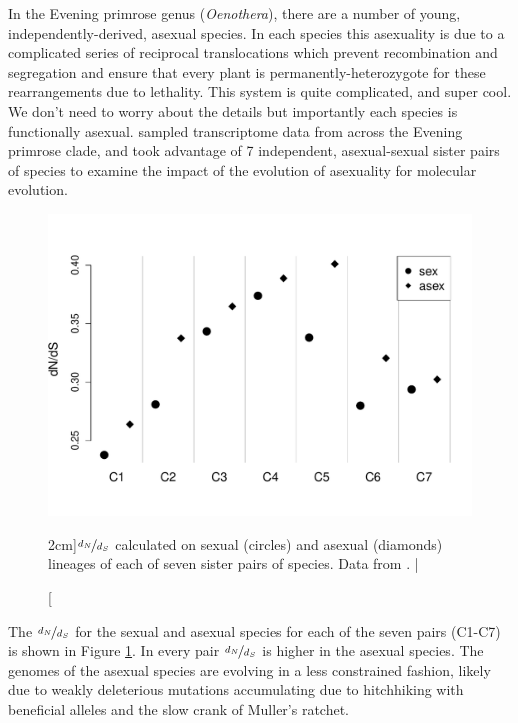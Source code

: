 In the Evening primrose genus ({\it Oenothera}), there are a number of young, independently-derived, asexual species. In each species this asexuality is due to a complicated series of reciprocal translocations which prevent recombination and segregation and ensure that every plant is permanently-heterozygote for these rearrangements due to lethality. This system is quite complicated, and super cool. We don't need to worry about the details but importantly each species is functionally asexual. \citet{hollister2014recurrent} sampled transcriptome data from across the Evening primrose clade, and took advantage of 7 independent, asexual-sexual sister pairs of species to examine the impact of the evolution of asexuality for molecular evolution.  
\begin{figure}
\begin{center}
  \includegraphics[width = 0.8 \textwidth]{Journal_figs/recom_selection/evening_primrose/evening_primrose_omega.pdf}
\end{center}
\caption[][2cm]{$\nicefrac{d_N}{d_S}$ calculated on sexual (circles) and asexual (diamonds) lineages of each of seven sister pairs of species. Data from \citet{hollister2014recurrent}. | } \label{fig:evening_primrose_omega}  %
\end{figure}

The $\nicefrac{d_N}{d_S}$ for the sexual and asexual species for each of the seven pairs (C1-C7) is shown in Figure \ref{fig:evening_primrose_omega}. In every pair $\nicefrac{d_N}{d_S}$ is higher in the asexual species. The genomes of the asexual species are evolving in a less constrained fashion, likely due to weakly deleterious mutations accumulating due to hitchhiking with beneficial alleles and the slow crank of Muller's ratchet. 



